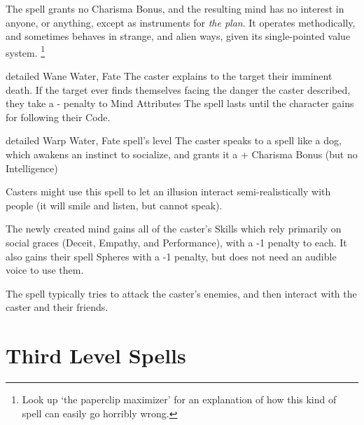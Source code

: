 \begin{multicols}{2}
{  The spell grants no Charisma Bonus, and the resulting mind has no interest in anyone, or anything, except as instruments for \emph{the plan}.
  It operates methodically, and sometimes behaves in strange, and alien ways, given its single-pointed value system.%
  \footnote{Look up `the paperclip maximizer' for an explanation of how this kind of spell can easily go horribly wrong.}
  }

  {detailed}%
  {Wane}%
  {Water, Fate}%
  {}%
  {The caster explains to the target their imminent death.
    If the target ever finds themselves facing the danger the caster described, they take a - penalty to Mind Attributes}%
  {The spell lasts until the character gains  for following their Code.}

  {detailed}%
  {Warp}%
  {Water, Fate}%
  {spell's level}%
  {The caster speaks to a spell like a dog, which awakens an instinct to socialize, and grants it a + Charisma Bonus (but no Intelligence)}%
  {
  Casters might use this spell to let an illusion interact semi-realistically with people (it will smile and listen, but cannot speak).

  The newly created mind gains all of the caster's Skills which rely primarily on social graces (Deceit, Empathy, and Performance), with a -1 penalty to each.
  It also gains their spell Spheres with a -1 penalty, but does not need an audible voice to use them.

  The spell typically tries to attack the caster's enemies, and then interact with the caster and their friends.

  }

\end{multicols}

\section{Third Level Spells}

